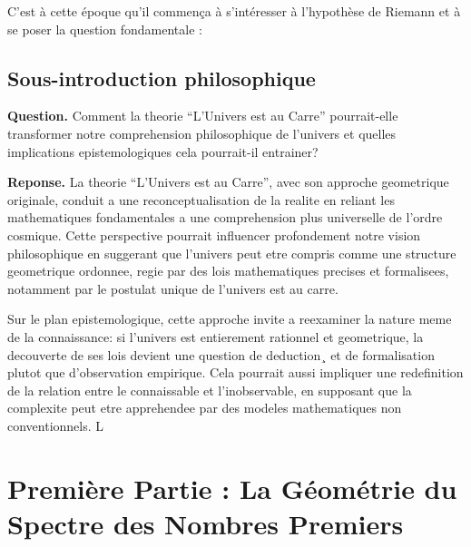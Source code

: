 \documentclass[a4paper,11pt]{article}
\begin{document}
C'est à cette époque qu'il commença à s'intéresser à l'hypothèse de Riemann et à se poser la question fondamentale :

\begin{center}
\end{center}

\subsection*{Sous-introduction philosophique}

\textbf{Question.} Comment la theorie ``L'Univers est au Carre'' pourrait-elle transformer notre comprehension philosophique de l'univers et quelles implications epistemologiques cela pourrait-il entrainer?

\medskip

\textbf{Reponse.} La theorie ``L'Univers est au Carre'', avec son approche geometrique originale, conduit a une reconceptualisation de la realite en reliant les mathematiques fondamentales a une comprehension 
plus universelle de l'ordre cosmique. Cette perspective pourrait influencer profondement notre vision philosophique en suggerant que l'univers peut etre compris comme une structure geometrique ordonnee, regie
 par des lois mathematiques precises et formalisees, notamment par le postulat unique de l'univers est au carre.

Sur le plan epistemologique, cette approche invite a reexaminer la nature meme de la connaissance: si l'univers est entierement rationnel et geometrique, la decouverte de ses lois devient une question de deduction¸
 et de formalisation plutot que d'observation empirique. Cela pourrait aussi impliquer une redefinition de la relation entre le connaissable et l'inobservable, en supposant que la complexite peut etre apprehendee par 
 des modeles mathematiques non conventionnels. L 


\newpage
\section{Première Partie : La Géométrie du Spectre des Nombres Premiers}
\end{document}
